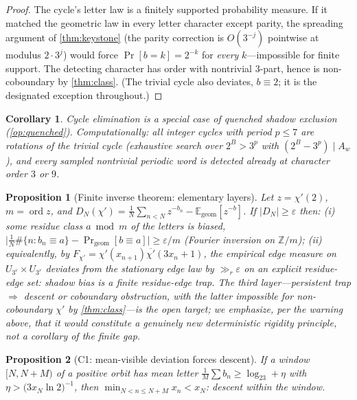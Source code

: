 \documentclass[11pt]{article}
\newcommand{\E}{\mathbb{E}}
\newcommand{\Z}{\mathbb{Z}}
\theoremstyle{plain}
\newtheorem{proposition}{Proposition}
\newtheorem{corollary}{Corollary}
\theoremstyle{definition}
\theoremstyle{remark}
\begin{document}
\begin{proof}
The cycle's letter law is a finitely supported probability measure. If
it matched the geometric law in every letter character except parity,
the spreading argument of \cref{thm:keystone} (the parity correction is
$O(3^{-j})$ pointwise at modulus $2\cdot3^j$) would force
$\Pr[b=k]=2^{-k}$ for \emph{every} $k$---impossible for finite support.
The detecting character has order with nontrivial $3$-part, hence is
non-coboundary by \cref{thm:class}. (The trivial cycle also deviates,
$b\equiv2$; it is the designated exception throughout.)
\end{proof}

\begin{corollary}
Cycle elimination is a special case of quenched shadow exclusion
(\cref{op:quenched}). Computationally: all integer cycles with period
$p\le7$ are rotations of the trivial cycle (exhaustive search over
$2^B>3^p$ with $(2^B-3^p)\mid A_w$), and every sampled nontrivial
periodic word is detected already at character order $3$ or $9$.
\end{corollary}

\begin{proposition}[Finite inverse theorem: elementary layers]
\label{prop:inverse}
Let $z=\chi'(2)$, $m=\operatorname{ord}z$, and
$D_N(\chi')=\frac1N\sum_{n<N}z^{-b_n}-\E_{\mathrm{geom}}[z^{-b}]$.
If $|D_N|\ge\varepsilon$ then: \emph{(i)} some residue class $a\bmod m$
of the letters is biased,
$\bigl|\frac1N\#\{n:b_n\equiv a\}-\Pr_{\mathrm{geom}}[b\equiv a]\bigr|
\ge\varepsilon/m$ (Fourier inversion on $\Z/m$); \emph{(ii)}
equivalently, by $F_{\chi'}=\chi'(x_{n+1})\overline{\chi'}(3x_n+1)$, the
empirical \emph{edge} measure on $U_{3^r}\times U_{3^r}$ deviates from
the stationary edge law by $\gg_r\varepsilon$ on an explicit
residue-edge set: \emph{shadow bias is a finite residue-edge trap}. The
third layer---\emph{persistent trap $\Rightarrow$ descent or coboundary
obstruction}, with the latter impossible for non-coboundary $\chi'$ by
\cref{thm:class}---is the open target; we emphasize, per the warning
above, that it would constitute a genuinely new deterministic rigidity
principle, not a corollary of the finite gap.
\end{proposition}

\begin{proposition}[C1: mean-visible deviation forces descent]
\label{prop:meandescent}
If a window $[N,N+M)$ of a positive orbit has mean letter
$\frac1M\sum b_n\ge\log_23+\eta$ with $\eta>\bigl(3x_N\ln2\bigr)^{-1}$,
then $\min_{N<n\le N+M}x_n<x_N$: descent within the window.
\end{proposition}
\end{document}
